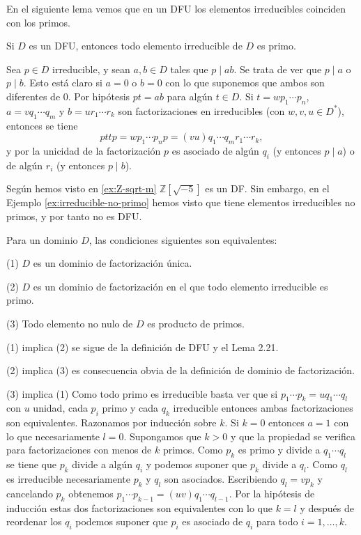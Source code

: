 En el siguiente lema vemos que en un DFU los elementos irreducibles coinciden con los primos.

\begin{lemma}{}{}
Si \(D\) es un DFU, entonces todo elemento irreducible de \(D\) es primo.
\end{lemma}

\begin{proofbox}
Sea \(p \in D\) irreducible, y sean \(a, b \in D\) tales que \(p \mid ab\). Se trata de ver que \(p \mid a\) o \(p \mid b\). Esto está claro si \(a = 0\) o \(b = 0\) con lo que suponemos que ambos son diferentes de 0. Por hipótesis \(pt = ab\) para algún \(t \in D\). Si \(t = w p_1 \cdots p_n\), \(a = v q_1 \cdots q_m\) y \(b = u r_1 \cdots r_k\) son factorizaciones en irreducibles (con \(w, v, u \in D^*\)), entonces se tiene
\[
pt tp = w p_1 \cdots p_n p  = (vu) q_1 \cdots q_m r_1 \cdots r_k,
\]
y por la unicidad de la factorización \(p\) es asociado de algún \(q_i\) (y entonces \(p \mid a\)) o de algún \(r_i\) (y entonces \(p \mid b\)).
\end{proofbox}

Según hemos visto en \ref{ex:Z-sqrt-m} \(\mathbb{Z}[\sqrt{-5}]\) es un DF. Sin embargo, en el Ejemplo \ref{ex:irreducible-no-primo} hemos visto que tiene elementos irreducibles no primos, y por tanto no es DFU.

\begin{proposition}{}{}
Para un dominio \(D\), las condiciones siguientes son equivalentes:

(1) \(D\) es un dominio de factorización única.

(2) \(D\) es un dominio de factorización en el que todo elemento irreducible es primo.

(3) Todo elemento no nulo de \(D\) es producto de primos.
\end{proposition}

\begin{proofbox}
(1) implica (2) se sigue de la definición de DFU y el Lema 2.21.

(2) implica (3) es consecuencia obvia de la definición de dominio de factorización.

(3) implica (1) Como todo primo es irreducible basta ver que si \(p_1 \cdots p_k = u q_1 \cdots q_l\) con \(u\) unidad, cada \(p_i\) primo y cada \(q_k\) irreducible entonces ambas factorizaciones son equivalentes. Razonamos por inducción sobre \(k\). Si \(k = 0\) entonces \(a = 1\) con lo que necesariamente \(l = 0\). Supongamos que \(k > 0\) y que la propiedad se verifica para factorizaciones con menos de \(k\) primos. Como \(p_k\) es primo y divide a \(q_1 \cdots q_l\) se tiene que \(p_k\) divide a algún \(q_i\) y podemos suponer que \(p_k\) divide a \(q_l\). Como \(q_l\) es irreducible necesariamente \(p_k\) y \(q_l\) son asociados. Escribiendo \(q_l = v p_k\) y cancelando \(p_k\) obtenemos \(p_1 \cdots p_{k-1} = (uv) q_1 \cdots q_{l-1}\). Por la hipótesis de inducción estas dos factorizaciones son equivalentes con lo que \(k = l\) y después de reordenar los \(q_i\) podemos suponer que \(p_i\) es asociado de \(q_i\) para todo \(i = 1, \ldots, k\).
\end{proofbox}
